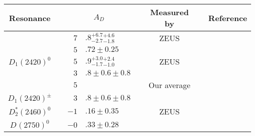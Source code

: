 {\setlength\tabcolsep{0pt}
	\begin{tabular}{cp{5pt}r@{}lp{5pt}cp{5pt}c}
		\toprule
		\rowcolor{Gray} Resonance &&\multicolumn{2}{c}{$A_{D}$} &&  \multicolumn{1}{c}{Measured by} &&  \multicolumn{1}{c}{Reference}
		\\ \midrule
		\multirow{5}{*}{$D_{1}^{}(2420)^{0}$}   &   & $7$                        & $.8_{-2.7}^{+6.7}{}_{-1.8}^{+4.6}$    &                       & ZEUS                           &                       & \cite{Abramowicz:2012ys}    \\
		                                        &   & $ 5$                       & $.72\pm0.25$                          &                       & \babar{}                       &                       & \cite{delAmoSanchez:2010vq} \\  
		                                        &   & $ 5$                       & $.9_{-1.7}^{+3.0}{}_{-1.0}^{+2.4}$    &                       & ZEUS                           &                       & \cite{Chekanov:2008ac}      \\  
		                                        &   & $ 3$                       & $.8\pm0.6\pm0.8$                      &                       & \babar{}                       &                       & \cite{Aubert:2008zc}        \\  \cmidrule{3-7}
		                                        &   & \cellcolor{Gray}$5$        & \cellcolor{Gray}{$.61 \pm 0.24$}      & \cellcolor{Gray}      & \cellcolor{Gray}  Our average  & \cellcolor{Gray}      &                             \\ \midrule
		\multirow{1}{*}{$D_{1}^{}(2420)^{\pm}$} &   & \cellcolor{LightGray}  $3$ & \cellcolor{LightGray}$.8\pm0.6\pm0.8$ & \cellcolor{LightGray} & \cellcolor{LightGray} \babar{} & \cellcolor{LightGray} & \cite{Aubert:2008zc}        \\	\midrule		
		\multirow{1}{*}{$D_{2}^{*}(2460)^{0}$}  &   & \cellcolor{LightGray} $-1$ & \cellcolor{LightGray}$.16\pm0.35$     & \cellcolor{LightGray} & \cellcolor{LightGray} ZEUS     & \cellcolor{LightGray} & \cite{Abramowicz:2012ys}    \\	\midrule
		\multirow{1}{*}{$D_{}^{}(2750)^{0}$}    &   & \cellcolor{LightGray} $-0$ & \cellcolor{LightGray}$.33\pm0.28$     & \cellcolor{LightGray} & \cellcolor{LightGray} \babar{} & \cellcolor{LightGray} & \cite{delAmoSanchez:2010vq} \\						
		\bottomrule
	\end{tabular}}